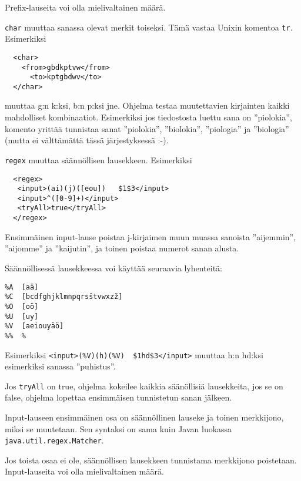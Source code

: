 \documentclass[12pt]{article}
\begin{document}
Prefix-lauseita voi olla mielivaltainen määrä.



\bigskip
\verb|char| muuttaa sanassa olevat merkit toiseksi. Tämä vastaa Unixin
komentoa \verb|tr|. Esimerkiksi

\begin{verbatim}
  <char>
    <from>gbdkptvw</from>
      <to>kptgbdwv</to>
  </char>
\end{verbatim}

muuttaa g:n k:ksi, b:n p:ksi jne. Ohjelma testaa muutettavien
kirjainten kaikki mahdolliset kombinaatiot. Esimerkiksi jos
tiedostosta luettu sana on ''piolokia'', komento yrittää tunnistaa
sanat ''piolokia'', ''biolokia'', ''piologia'' ja ''biologia'' (mutta
ei välttämättä tässä järjestyksessä :-).




\verb|regex| muuttaa säännöllisen lausekkeen. Esimerkiksi

\begin{verbatim}
  <regex>
   <input>(ai)(j)([eou])   $1$3</input>
   <input>^([0-9]+)</input>
   <tryAll>true</tryAll>
  </regex>
\end{verbatim}

Ensimmäinen input-lause poistaa j-kirjaimen muun muassa sanoista
''aijemmin'', ''aijomme'' ja ''kaijutin'', ja toinen poistaa numerot
sanan alusta.


Säännöllisessä lausekkeessa voi käyttää seuraavia lyhenteitä:

\begin{verbatim}
%A  [aä]
%C  [bcdfghjklmnpqrsštvwxzž]
%O  [oö]
%U  [uy]
%V  [aeiouyäö]
%%  %
\end{verbatim}

Esimerkiksi \verb=<input>(%V)(h)(%V)  $1hd$3</input>=
muuttaa h:n hd:ksi esimerkiksi sanassa ''puhistus''.


Jos \verb=tryAll= on true, ohjelma kokeilee kaikkia säänöllisiä
lausekkeita, jos se on false, ohjelma lopettaa ensimmäisen tunnistetun
sanan jälkeen.

Input-lauseen ensimmäinen osa on säännöllinen lauseke ja toinen
merkkijono, miksi se muutetaan. Sen syntaksi on sama kuin Javan
luokassa \verb=java.util.regex.Matcher=.

Jos toista osaa ei ole, säännöllisen lausekkeen tunnistama merkkijono
poistetaan. Input-lauseita voi olla mielivaltainen määrä.
\end{document}
